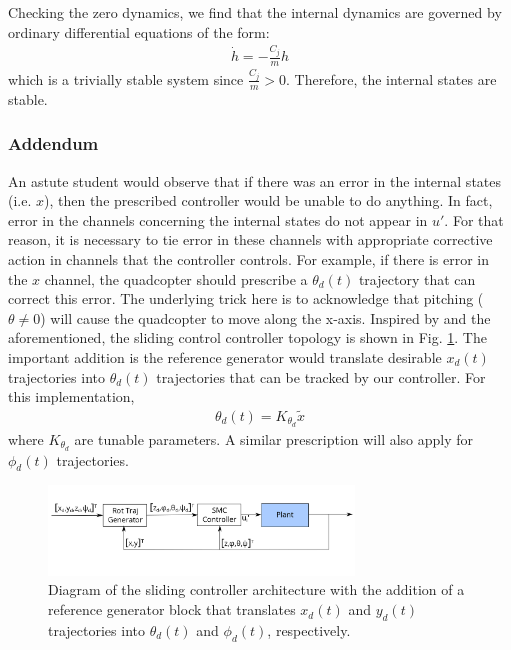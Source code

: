\documentclass[conference]{IEEEtran}
\begin{document}
Checking the zero dynamics, we find that the internal dynamics are governed by ordinary differential equations of the form:
\begin{align*}
\dot{h} = -\frac{C_j}{m}h
\end{align*}
which is a trivially stable system since $\frac{C_j}{m} > 0$. Therefore, the internal states are stable.

\subsubsection{Addendum}
An astute student would observe that if there was an error in the internal states (i.e. $x$), then the prescribed controller would be unable to do anything. In fact, error in the channels concerning the internal states do not appear in $u'$. For that reason, it is necessary to tie error in these channels with appropriate corrective action in channels that the controller controls. For example, if there is error in the $x$ channel, the quadcopter should prescribe a $\theta_d(t)$ trajectory that can correct this error. The underlying trick here is to acknowledge that pitching ($\theta \neq 0$) will cause the quadcopter to move along the x-axis. Inspired by \cite{bib:topology} and the aforementioned, the sliding control controller topology is shown in Fig. \ref{fig:smc_controller}. The important addition is the reference generator would translate desirable $x_d(t)$ trajectories into $\theta_d(t)$ trajectories that can be tracked by our controller. For this implementation,
\begin{align*}
\theta_d(t) = K_{\theta_d}\widetilde{x}
\end{align*}
where $K_{\theta_d}$ are tunable parameters. A similar prescription will also apply for $\phi_d(t)$ trajectories.

\begin{figure}[!ht]
\centering
\includegraphics[width=3.2in]{images/smc_controller.png}
\caption{Diagram of the sliding controller architecture with the addition of a reference generator block that translates $x_d(t)$ and $y_d(t)$ trajectories into $\theta_d(t)$ and $\phi_d(t)$, respectively.}
\label{fig:smc_controller}
\end{figure}
\end{document}
